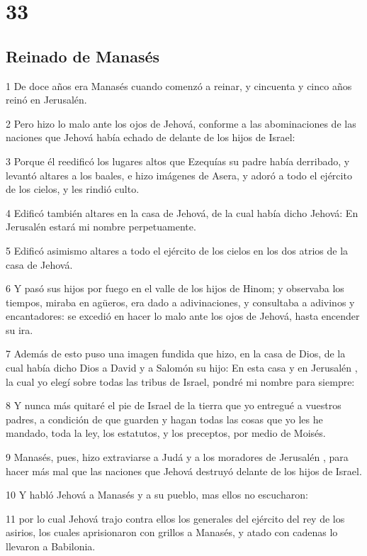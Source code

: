 \chapter{33}

\section*{Reinado de Manasés}

\par 1 De doce años era Manasés cuando comenzó a reinar, y cincuenta y cinco años reinó en Jerusalén.
\par 2 Pero hizo lo malo ante los ojos de Jehová, conforme a las abominaciones de las naciones que Jehová había echado de delante de los hijos de Israel:
\par 3 Porque él reedificó los lugares altos que Ezequías su padre había derribado, y levantó altares a los baales, e hizo imágenes de Asera, y adoró a todo el ejército de los cielos, y les rindió culto. 
\par 4 Edificó también altares en la casa de Jehová, de la cual había dicho Jehová: En Jerusalén  estará mi nombre perpetuamente. 
\par 5 Edificó asimismo altares a todo el ejército de los cielos en los dos atrios de la casa de Jehová.
\par 6 Y pasó sus hijos por fuego en el valle de los hijos de Hinom; y observaba los tiempos, miraba en agüeros, era dado a adivinaciones, y consultaba a adivinos y encantadores: se excedió en hacer lo malo ante los ojos de Jehová, hasta encender su ira.
\par 7 Además de esto puso una imagen fundida que hizo, en la casa de Dios, de la cual había dicho Dios a David y a Salomón su hijo: En esta casa y en Jerusalén , la cual yo elegí sobre todas las tribus de Israel, pondré mi nombre para siempre:
\par 8 Y nunca más quitaré el pie de Israel de la tierra que yo entregué a vuestros padres, a condición de que guarden y hagan todas las cosas que yo les he mandado, toda la ley, los estatutos, y los preceptos, por medio de Moisés. 
\par 9 Manasés, pues, hizo extraviarse a Judá y a los moradores de Jerusalén , para hacer más mal que las naciones que Jehová destruyó delante de los hijos de Israel.
\par 10 Y habló Jehová a Manasés y a su pueblo, mas ellos no escucharon:
\par 11 por lo cual Jehová trajo contra ellos los generales del ejército del rey de los asirios, los cuales aprisionaron con grillos a Manasés, y atado con cadenas lo llevaron a Babilonia.
